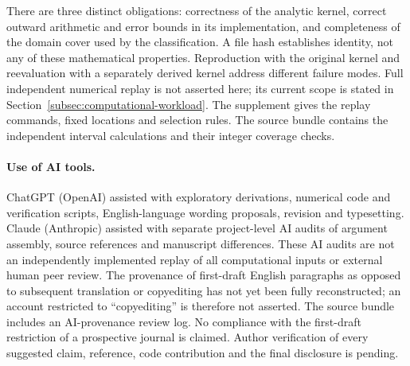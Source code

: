 There are three distinct obligations: correctness of the analytic
kernel, correct outward arithmetic and error bounds in its
implementation, and completeness of the domain cover used by
the classification.  A file hash establishes identity, not any
of these mathematical properties.  Reproduction with the original
kernel and reevaluation with a separately derived kernel address
different failure modes.  Full independent numerical replay is
not asserted here; its current scope is stated in
Section~\ref{subsec:computational-workload}.
The supplement gives the replay commands, fixed locations and selection rules. The source bundle contains the independent interval calculations and their integer coverage checks.

\paragraph{Use of AI tools.}
ChatGPT (OpenAI) assisted with exploratory derivations, numerical
code and verification scripts, English-language wording proposals,
revision and typesetting. Claude (Anthropic) assisted with separate
project-level AI audits of argument assembly, source references and
manuscript differences. These AI audits are not an independently
implemented replay of all computational inputs or external human peer
review. The provenance of first-draft English paragraphs as opposed
to subsequent translation or copyediting has not yet been fully
reconstructed; an account restricted to ``copyediting'' is therefore
not asserted. The source bundle includes an AI-provenance review log.
No compliance with the first-draft restriction of a prospective
journal is claimed. Author verification of every suggested claim,
reference, code contribution and the final disclosure is pending.
